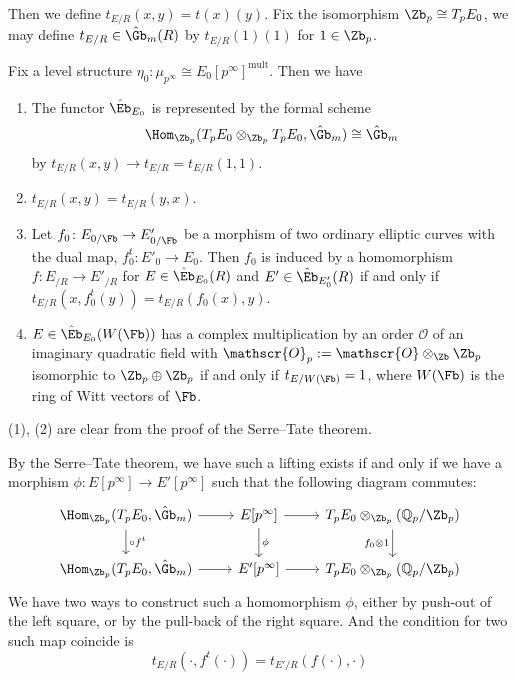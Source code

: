 \documentclass[twoside]{article}
\begin{document}
Then we define $t_{E/R}(x,y)=t(x)(y)$.
Fix the isomorphism $\Zb_{p}\cong T_{p}E_{0}$,
we may define $t_{E/R}\in \hat{\Gb}_{m}(R)$ by $t_{E/R}(1)(1)$ for $1\in \Zb_{p}$.

\begin{theorem}
    Fix a level structure $\eta_{0}\colon  \mu_{p^{\infty}}\cong E_{0}[p^{\infty}]^{\mathrm{mult}}$.
    Then we have 
    \begin{enumerate}
        \item The functor $\hat{\Eb}_{E_{0}}$ is represented by the formal scheme
        \[   \Hom_{\Zb_{p}}(T_{p}E_{0}\otimes_{\Zb_{p}} T_{p}E_{0},\hat{\Gb}_{m})\cong \hat{\Gb}_{m}   \]
        by $t_{E/R}(x,y)\to t_{E/R}=t_{E/R}(1,1)$.

        \item $t_{E/R}(x,y)=t_{E/R}(y,x)$.

        \item Let $f_{0}\colon  E_{0/\Fb} \to E'_{0/\Fb}$ be a morphism 
        of two ordinary elliptic curves with the dual map, 
        $f^{t}_{0}\colon  E'_{0} \to E_{0}$. Then $f_{0}$ is induced by a homomorphism 
        $f\colon  E_{/R} \to E'_{/R}$ for $E\in \hat{\Eb}_{E_{0}}(R)$ and 
        $E'\in \hat{\Eb}_{E'_{0}}(R)$ if and only if 
        $t_{E/R}(x,f^{t}_{0}(y))=t_{E/R}(f_{0}(x),y)$.
        
        \item $E\in \hat{\Eb}_{E_{0}}(W(\Fb))$ has a complex multiplication 
        by an order $\mathscr{O}$ of an imaginary quadratic field with 
        $\mathscr{O}_{p}:=\mathscr{O}\otimes_{\Zb}\Zb_{p}$ isomorphic to 
        $\Zb_{p}\oplus \Zb_{p}$ if and only if $t_{E/W(\Fb)}=1$,
        where $W(\Fb)$ is the ring of Witt vectors of $\Fb$.    
    \end{enumerate}
\end{theorem}

\pf
    (1), (2) are clear from the proof of the Serre--Tate theorem.

    By the Serre--Tate theorem, we have such a lifting exists 
    if and only if we have a morphism $\phi\colon  E[p^{\infty}]\to E'[p^{\infty}]$ 
    such that the following diagram commutes:
    \[ \begin{tikzcd}
        \Hom_{\Zb_{p}}(T_{p}E_{0},\hat{\Gb}_{m})\ar[r]\ar[d, "\circ f^{t}"]&
        E[p^{\infty}] \ar[r]\ar[d, "\phi"] &
        T_{p}E_{0}\otimes_{\Zb_{p}} (\mathbb{Q}_{p}/\Zb_{p}) \ar[d, "f_{0}\otimes 1"'] \\
        \Hom_{\Zb_{p}}(T_{p}E_{0},\hat{\Gb}_{m})\ar[r]&
        E'[p^{\infty}]\ar[r]&
        T_{p}E_{0}\otimes_{\Zb_{p}}(\mathbb{Q}_{p}/\Zb_{p})
    \end{tikzcd} \]
    We have two ways to construct such a homomorphism $\phi$,
    either by push-out of the left square,
    or by the pull-back of the right square.
    And the condition for two such map coincide is 
    \[  t_{E/R}(\cdot,f^{t}(\cdot))=t_{E'/R}(f(\cdot),\cdot)  \]
\end{document}
